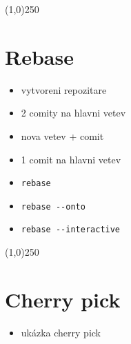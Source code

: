 \documentclass[12pt]{article}
\begin{document}
\begin{center}\line(1,0){250}\end{center}

\section{Rebase}

\begin{itemize}
	\item vytvoreni repozitare
	\item 2 comity na hlavni vetev
	\item nova vetev + comit
	\item 1 comit na hlavni vetev
	\item \texttt{rebase}
	\item \texttt{rebase {-}{-}onto}
	\item \texttt{rebase {-}{-}interactive}
\end{itemize}

\begin{center}\line(1,0){250}\end{center}

\section{Cherry pick}

\begin{itemize}
	\item ukázka cherry pick
\end{itemize}
\end{document}
